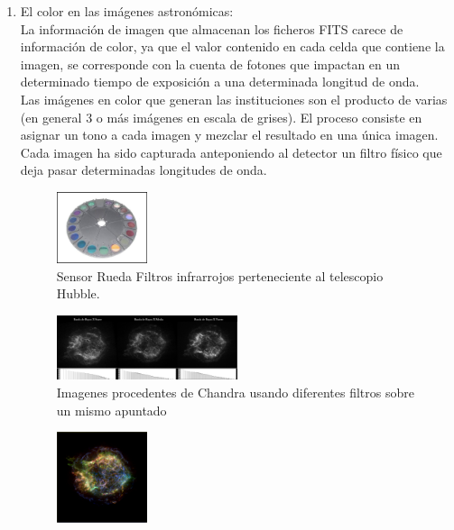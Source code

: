 	\begin{enumerate}
		\item El color en las imágenes astronómicas:\\
			La información de imagen que almacenan los ficheros FITS carece de información de color, ya que el valor contenido en cada celda que contiene la imagen, se corresponde con la cuenta de fotones que impactan en un determinado tiempo de exposición a una determinada longitud de onda. 
			\\Las imágenes en color que generan las instituciones son el producto de varias (en general 3 o más imágenes en escala de grises). El proceso consiste en asignar un tono a cada imagen y mezclar el resultado en una única imagen. Cada imagen ha sido capturada anteponiendo al detector un filtro físico que deja pasar determinadas longitudes de onda.
			\begin{figure}
				\centering
				\includegraphics[width=0.25\textwidth]{images/irfiltwheel_Hubble.jpg}
				\caption{\label{fig:irfiltwheel_Hubble}{\small Sensor Rueda Filtros infrarrojos perteneciente al telescopio Hubble.}}
			\end{figure}
			\begin{figure}
				\centering
				\includegraphics[width=0.5\textwidth]{images/Chandra-Compo-Images.jpg}
				\caption{\label{fig:Chandra Space Telescope Images}{\small Imagenes procedentes de Chandra usando diferentes filtros sobre un mismo apuntado}}
			\end{figure}
			\begin{figure}
				\centering
				\includegraphics[width=0.25\textwidth]{images/Chandra-Composed-Images.jpg}

\end{figure}
\end{enumerate}
